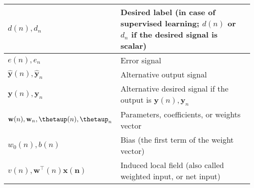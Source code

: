 \documentclass{article}
\begin{document}
\begin{xltabular}{\textwidth}{XX}
	\(d(n), d_n\)                                                                                                         & Desired label (in case of supervised learning; \(d(n)\) or \(d_n\) if the desired signal is scalar)                                                                                                                          \\ \hline
	\(e(n), e_n\)                                                                                                         & Error signal                                                                                                                                                                                                                 \\ \hline
	\(\hat{\mathbf{y}}(n), \hat{\mathbf{y}}_n\)                                                                           & Alternative output signal                                                                                                                                                                                                    \\ \hline
	\(\mathbf{y}(n), \mathbf{y}_n\)                                                                                       & Alternative desired signal if the output is \(\mathbf{y}(n), \mathbf{y}_n\)                                                                                                                                                  \\ \hline
	\(\mathbf{w}(n), \mathbf{w}_n, \boldsymbol{\thetaup}(n), \boldsymbol{\thetaup}_n\)                                    & Parameters, coefficients, or weights vector                                                                                                                                                                                  \\ \hline
	\(w_0(n), b(n)\)                                                                                                      & Bias (the first term of the weight vector)                                                                                                                                                                                   \\ \hline
	\(v(n), \mathbf{w}^\top(n) \mathbf{x(n)}\)                                                                            & Induced local field \cite{bishopPatternRecognitionMachine2006} (also called weighted input, or net input)                                                                                                                    \\ \hline

\end{xltabular}
\end{document}
